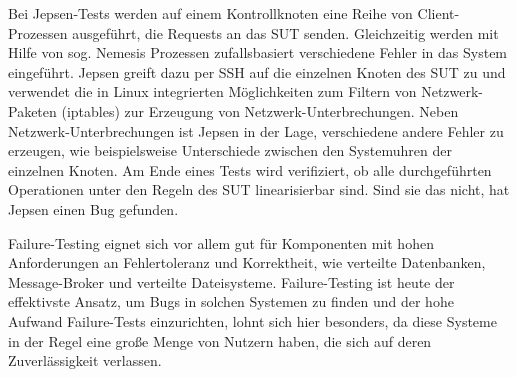 \documentclass[12pt,a4paper]{report}
\begin{document}
Bei Jepsen-Tests werden auf einem Kontrollknoten eine Reihe von Client-Prozessen ausgeführt, die Requests an das SUT senden.
Gleichzeitig werden mit Hilfe von sog. Nemesis Prozessen zufallsbasiert verschiedene Fehler in das System eingeführt. Jepsen
greift dazu per SSH auf die einzelnen Knoten des SUT zu und verwendet die in Linux integrierten Möglichkeiten zum Filtern von
Netzwerk-Paketen (iptables) zur Erzeugung von Netzwerk-Unterbrechungen. Neben Netzwerk-Unterbrechungen ist Jepsen in der Lage,
verschiedene andere Fehler zu erzeugen, wie beispielsweise Unterschiede zwischen den Systemuhren der einzelnen Knoten. Am Ende
eines Tests wird verifiziert, ob alle durchgeführten Operationen unter den Regeln des SUT linearisierbar sind. Sind sie das nicht,
hat Jepsen einen Bug gefunden. \cite{jepsen_github}

Failure-Testing eignet sich vor allem gut für Komponenten mit hohen Anforderungen an Fehlertoleranz und Korrektheit, wie verteilte
Datenbanken, Message-Broker und verteilte Dateisysteme. Failure-Testing ist heute der effektivste Ansatz, um Bugs in solchen
Systemen zu finden \cite{abstracting_the_geniuses} und der hohe Aufwand Failure-Tests einzurichten, lohnt sich hier besonders, da
diese Systeme in der Regel eine große Menge von Nutzern haben, die sich auf deren Zuverlässigkeit verlassen.
\end{document}
